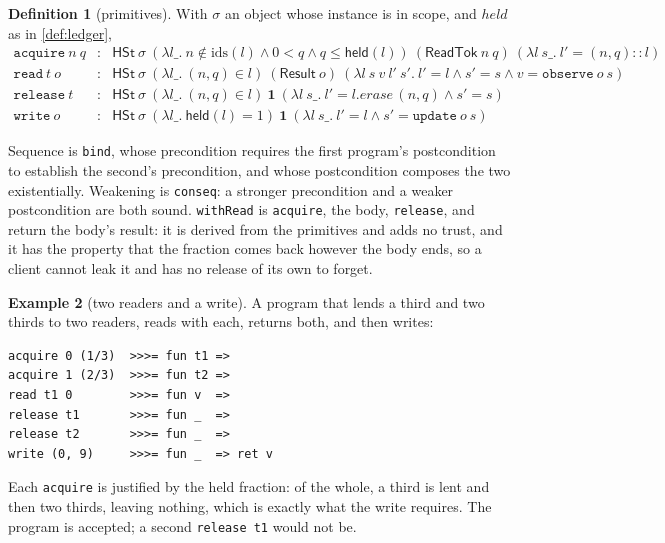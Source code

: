 \documentclass[11pt,a4paper]{article}
\theoremstyle{definition}
\newtheorem{definition}{Definition}[section]
\newtheorem{example}[definition]{Example}
\theoremstyle{plain}
\newcommand{\held}{\mathsf{held}}
\newcommand{\code}[1]{\texttt{#1}}
\begin{document}
\begin{definition}[primitives]\label{def:prims}
With $\sigma$ an object whose instance is in scope, and $\mathit{held}$ as in
\cref{def:ledger},
{\small\[
\begin{array}{rcll}
\code{acquire}\ n\ q & : & \mathsf{HSt}\ \sigma\ (\lambda l\_.\ n \notin \mathrm{ids}(l) \land
  0 < q \land q \leq \held(l))\ (\mathsf{ReadTok}\ n\ q)\ (\lambda l\ s\_.\ l' = (n,q)::l)
\\[2pt]
\code{read}\ t\ o & : & \mathsf{HSt}\ \sigma\ (\lambda l\_.\ (n,q) \in l)\ (\mathsf{Result}\ o)\
  (\lambda l\ s\ v\ l'\ s'.\ l' = l \land s' = s \land v = \code{observe}\ o\ s)
\\[2pt]
\code{release}\ t & : & \mathsf{HSt}\ \sigma\ (\lambda l\_.\ (n,q) \in l)\ \mathbf{1}\
  (\lambda l\ s\_.\ l' = l.\mathit{erase}\,(n,q) \land s' = s)
\\[2pt]
\code{write}\ o & : & \mathsf{HSt}\ \sigma\ (\lambda l\_.\ \held(l) = 1)\ \mathbf{1}\
  (\lambda l\ s\_.\ l' = l \land s' = \code{update}\ o\ s)
\end{array}
\]}
\end{definition}

Sequence is \code{bind}, whose precondition requires the first program's
postcondition to establish the second's precondition, and whose postcondition
composes the two existentially. Weakening is \code{conseq}: a stronger
precondition and a weaker postcondition are both sound. \code{withRead} is
\code{acquire}, the body, \code{release}, and return the body's result: it is
derived from the primitives and adds no trust, and it has the property that the
fraction comes back however the body ends, so a client cannot leak it and has no
release of its own to forget.

\begin{example}[two readers and a write]\label{ex:two}
A program that lends a third and two thirds to two readers, reads with each,
returns both, and then writes:

\par\medskip\noindent
\begin{minipage}{\linewidth}
\begin{verbatim}
acquire 0 (1/3)  >>>= fun t1 =>
acquire 1 (2/3)  >>>= fun t2 =>
read t1 0        >>>= fun v  =>
release t1       >>>= fun _  =>
release t2       >>>= fun _  =>
write (0, 9)     >>>= fun _  => ret v
\end{verbatim}
\end{minipage}
\par\medskip
Each \code{acquire} is justified by the held fraction: of the whole, a third is
lent and then two thirds, leaving nothing, which is exactly what the write
requires. The program is accepted; a second \code{release t1} would not be.
\end{example}
\end{document}
